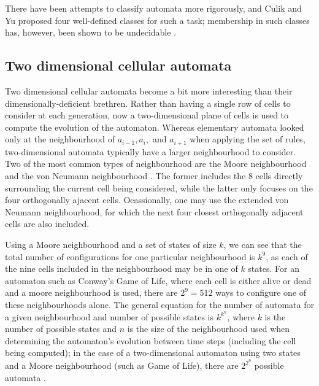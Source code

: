 \documentclass[11pt,a4paper]{article}
\begin{document}
    There have been attempts to classify automata more rigorously, and Culik and
    Yu proposed four well-defined classes for such a task; membership in such
    classes has, however, been shown to be undecidable \cite{CulikYuMembership}.

    \subsection{Two dimensional cellular automata}
    Two dimensional cellular automata become a bit more interesting than their
    dimensionally-deficient brethren. Rather than having a single row of cells
    to consider at each generation, now a two-dimensional plane of cells is used
    to compute the evolution of the automaton. Whereas elementary automata
    looked only at the neighbourhood of $a_{i-1}, a_i,$ and $a_{i+1}$ when
    applying the set of rules, two-dimensional automata typically have a larger
    neighbourhood to consider. Two of the most common types of neighbourhood are
    the Moore neighbourhood and the von Neumann neighbourhood
    \cite{neighbourhoods}. The former includes the 8 cells directly surrounding
    the current cell being considered, while the latter only focuses on the four
    orthogonally ajacent cells. Ocassionally, one may use the extended von
    Neumann neighbourhood, for which the next four closest orthogonally adjacent
    cells are also included.

    Using a Moore neighbourhood and a set of states of size $k$, we can see that
    the total number of configurations for one particular neighbourhood is
    $k^9$, as each of the nine cells included in the neighbourhood may be in one
    of $k$ states. For an automaton such as Conway's Game of Life, where each
    cell is either alive or dead and a moore neighbourhood is used, there are
    $2^9=512$ ways to configure one of these neighbourhoods alone. The general
    equation for the number of automata for a given neighbourhood and number of
    possible states is $k^{k^n}$, where $k$ is the number of possible states and
    $n$ is the size of the neighbourhood used when determining the automaton's
    evolution between time steps (including the cell being computed); in the
    case of a two-dimensional automaton using two states and a Moore
    neighbourhood (such as Game of Life), there are $2^{2^9}$ possible automata
    \cite{num_rules}.
\end{document}
